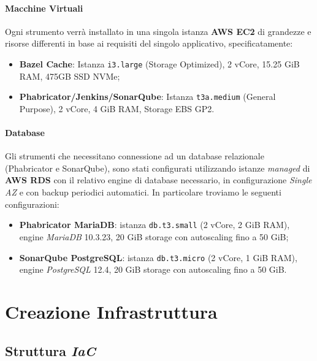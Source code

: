 \documentclass[../main.tex]{subfiles}
\begin{document}
    	    \paragraph{Macchine Virtuali}
    	    Ogni strumento verrà installato in una singola istanza \textbf{AWS EC2} di grandezze e risorse differenti in base ai requisiti del singolo applicativo, specificatamente:
    	    \begin{itemize}
    	        \item \textbf{Bazel Cache}: Istanza \verb|i3.large| (Storage Optimized), 2 vCore, 15.25 GiB RAM, 475GB SSD NVMe;
    	        \item \textbf{Phabricator/Jenkins/SonarQube}: Istanza \verb|t3a.medium| (General Purpose), 2 vCore, 4 GiB RAM, Storage EBS GP2.
    	    \end{itemize}
    	    
    	    \paragraph{Database}
    	    Gli strumenti che necessitano connessione ad un database relazionale (Phabricator e SonarQube), sono stati configurati utilizzando istanze \emph{managed} di \textbf{AWS RDS} con il relativo engine di database necessario, in configurazione \emph{Single AZ} e con backup periodici automatici. In particolare troviamo le seguenti configurazioni:
    	    \begin{itemize}
    	        \item \textbf{Phabricator MariaDB}: istanza \verb|db.t3.small| (2 vCore, 2 GiB RAM), engine \emph{MariaDB} 10.3.23, 20 GiB storage con autoscaling fino a 50 GiB;
    	        \item \textbf{SonarQube PostgreSQL}: istanza \verb|db.t3.micro| (2 vCore, 1 GiB RAM), engine \emph{PostgreSQL} 12.4, 20 GiB storage con autoscaling fino a 50 GiB.
    	    \end{itemize}
    	
    	\pagebreak
    	
    	\section{Creazione Infrastruttura}
    	    
    	    \subsection{Struttura \emph{IaC}}
    	
\end{document}
